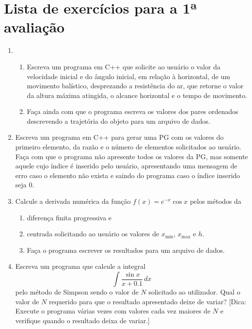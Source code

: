 \documentclass{article}
\begin{document}
\section*{Lista de exercícios para a 1ª avaliação}

\begin{enumerate}
    \item 
    \begin{enumerate}
        \item Escreva um programa em C++ que solicite ao usuário o valor da velocidade inicial e do ângulo inicial, em relação à horizontal, de um movimento balístico, desprezando a resistência do ar, que retorne o valor da altura máxima atingida, o alcance horizontal e o tempo de movimento. 
        \item Faça ainda com que o programa escreva os valores dos pares ordenados descrevendo a trajetória do objeto para um arquivo de dados.
    \end{enumerate}

    \item Escreva um programa em C++ para gerar uma PG com os valores do primeiro elemento, da razão e o número de elementos solicitados ao usuário. Faça com que o programa não apresente todos os valores da PG, mas somente aquele cujo índice é inserido pelo usuário, apresentando uma mensagem de erro caso o elemento não exista e saindo do programa caso o índice inserido seja 0.

    \item Calcule a derivada numérica da função \( f(x) = e^{-x} \cos x \) pelos métodos da 
    \begin{enumerate}
        \item diferença finita progressiva e 
        \item centrada solicitando ao usuário os valores de \( x_{\text{min}} \), \( x_{\text{max}} \) e \( h \). 
        \item Faça o programa escrever os resultados para um arquivo de dados.
    \end{enumerate}

    \item Escreva um programa que calcule a integral 
    \[
    \int \frac{\sin x}{x + 0.1} \, dx
    \]
    pelo método de Simpson sendo o valor de \( N \) solicitado ao utilizador. Qual o valor de \( N \) requerido para que o resultado apresentado deixe de variar? [Dica: Execute o programa várias vezes com valores cada vez maiores de \( N \) e verifique quando o resultado deixa de variar.]


\end{enumerate}
\end{document}
